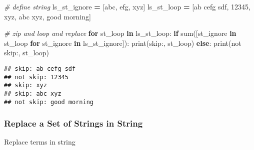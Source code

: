 \documentclass[
]{book}
\newenvironment{Shaded}{\begin{snugshade}}{\end{snugshade}}
\newcommand{\BuiltInTok}[1]{#1}
\newcommand{\CommentTok}[1]{\textcolor[rgb]{0.56,0.35,0.01}{\textit{#1}}}
\newcommand{\ControlFlowTok}[1]{\textcolor[rgb]{0.13,0.29,0.53}{\textbf{#1}}}
\newcommand{\KeywordTok}[1]{\textcolor[rgb]{0.13,0.29,0.53}{\textbf{#1}}}
\newcommand{\NormalTok}[1]{#1}
\newcommand{\OperatorTok}[1]{\textcolor[rgb]{0.81,0.36,0.00}{\textbf{#1}}}
\newcommand{\StringTok}[1]{\textcolor[rgb]{0.31,0.60,0.02}{#1}}
\begin{document}
\begin{Shaded}
\begin{Highlighting}[]
\CommentTok{\# define string}
\NormalTok{ls\_st\_ignore }\OperatorTok{=}\NormalTok{ [}\StringTok{\textquotesingle{}abc\textquotesingle{}}\NormalTok{, }\StringTok{\textquotesingle{}efg\textquotesingle{}}\NormalTok{, }\StringTok{\textquotesingle{}xyz\textquotesingle{}}\NormalTok{]}
\NormalTok{ls\_st\_loop }\OperatorTok{=}\NormalTok{ [}\StringTok{\textquotesingle{}ab cefg sdf\textquotesingle{}}\NormalTok{, }\StringTok{\textquotesingle{}12345\textquotesingle{}}\NormalTok{, }\StringTok{\textquotesingle{}xyz\textquotesingle{}}\NormalTok{, }\StringTok{\textquotesingle{}abc xyz\textquotesingle{}}\NormalTok{, }\StringTok{\textquotesingle{}good morning\textquotesingle{}}\NormalTok{]}

\CommentTok{\# zip and loop and replace}
\ControlFlowTok{for}\NormalTok{ st\_loop }\KeywordTok{in}\NormalTok{ ls\_st\_loop:}
  \ControlFlowTok{if} \BuiltInTok{sum}\NormalTok{([st\_ignore }\KeywordTok{in}\NormalTok{ st\_loop }\ControlFlowTok{for}\NormalTok{ st\_ignore }\KeywordTok{in}\NormalTok{ ls\_st\_ignore]):}
    \BuiltInTok{print}\NormalTok{(}\StringTok{\textquotesingle{}skip:\textquotesingle{}}\NormalTok{, st\_loop)}
  \ControlFlowTok{else}\NormalTok{:}
    \BuiltInTok{print}\NormalTok{(}\StringTok{\textquotesingle{}not skip:\textquotesingle{}}\NormalTok{, st\_loop)}
\end{Highlighting}
\end{Shaded}

\begin{verbatim}
## skip: ab cefg sdf
## not skip: 12345
## skip: xyz
## skip: abc xyz
## not skip: good morning
\end{verbatim}

\hypertarget{replace-a-set-of-strings-in-string}{%
\subsubsection{Replace a Set of Strings in String}\label{replace-a-set-of-strings-in-string}}

Replace terms in string
\end{document}

